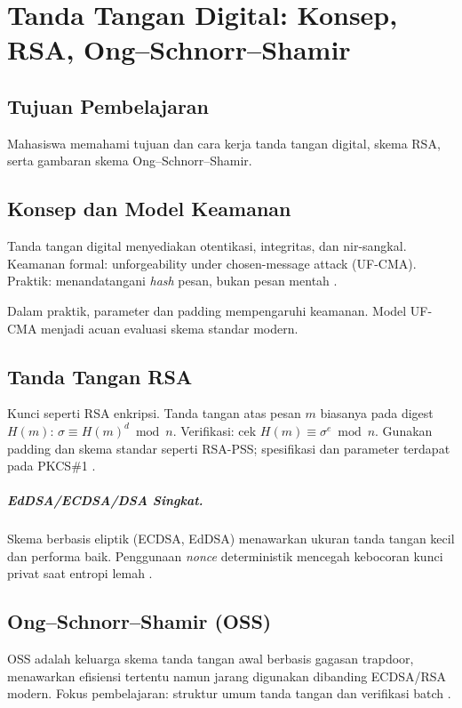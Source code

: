 \documentclass[../main.tex]{subfiles}
\begin{document}
\chapter{Tanda Tangan Digital: Konsep, RSA, Ong--Schnorr--Shamir}

\section{Tujuan Pembelajaran}
Mahasiswa memahami tujuan dan cara kerja tanda tangan digital, skema RSA, serta gambaran skema Ong--Schnorr--Shamir.

\section{Konsep dan Model Keamanan}
Tanda tangan digital menyediakan otentikasi, integritas, dan nir-sangkal. Keamanan formal: unforgeability under chosen-message attack (UF-CMA). Praktik: menandatangani \emph{hash} pesan, bukan pesan mentah \citep{katzlindell}.

Dalam praktik, parameter dan padding mempengaruhi keamanan. Model UF-CMA menjadi acuan evaluasi skema standar modern.

\section{Tanda Tangan RSA}
Kunci seperti RSA enkripsi. Tanda tangan atas pesan \(m\) biasanya pada digest \(H(m)\): \(\sigma\equiv H(m)^d\bmod n\). Verifikasi: cek \(H(m)\equiv \sigma^e\bmod n\). Gunakan padding dan skema standar seperti RSA-PSS; spesifikasi dan parameter terdapat pada PKCS\#1 \citep{katzlindell,stallings,rfc8017}.

\paragraph{EdDSA/ECDSA/DSA Singkat.} Skema berbasis eliptik (ECDSA, EdDSA) menawarkan ukuran tanda tangan kecil dan performa baik. Penggunaan \emph{nonce} deterministik mencegah kebocoran kunci privat saat entropi lemah \citep{rfc6979,rfc8032,fips186-5}.

\section{Ong--Schnorr--Shamir (OSS)}
OSS adalah keluarga skema tanda tangan awal berbasis gagasan trapdoor, menawarkan efisiensi tertentu namun jarang digunakan dibanding ECDSA/RSA modern. Fokus pembelajaran: struktur umum tanda tangan dan verifikasi batch \citep{stallings}.
\end{document}

